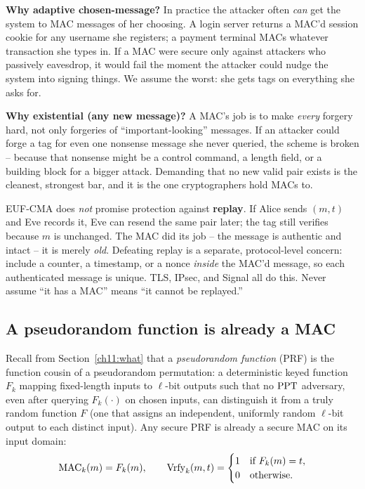 \begin{whybox}
\textbf{Why adaptive chosen-message?} In practice the attacker often \emph{can} get the system to MAC messages of her choosing. A login server returns a MAC'd session cookie for any username she registers; a payment terminal MACs whatever transaction she types in. If a MAC were secure only against attackers who passively eavesdrop, it would fail the moment the attacker could nudge the system into signing things. We assume the worst: she gets tags on everything she asks for.

\textbf{Why existential (any new message)?} A MAC's job is to make \emph{every} forgery hard, not only forgeries of ``important-looking'' messages. If an attacker could forge a tag for even one nonsense message she never queried, the scheme is broken -- because that nonsense might be a control command, a length field, or a building block for a bigger attack. Demanding that no new valid pair exists is the cleanest, strongest bar, and it is the one cryptographers hold MACs to.
\end{whybox}

\begin{trapbox}
EUF-CMA does \emph{not} promise protection against \textbf{replay}. If Alice sends $(m,t)$ and Eve records it, Eve can resend the same pair later; the tag still verifies because $m$ is unchanged. The MAC did its job -- the message is authentic and intact -- it is merely \emph{old}. Defeating replay is a separate, protocol-level concern: include a counter, a timestamp, or a nonce \emph{inside} the MAC'd message, so each authenticated message is unique. TLS, IPsec, and Signal all do this. Never assume ``it has a MAC'' means ``it cannot be replayed.''
\end{trapbox}

\subsection{A pseudorandom function is already a MAC}
\label{ch15:prf-is-mac}

Recall from Section~\ref{ch11:what} that a \emph{pseudorandom function} (PRF) is the function cousin of a pseudorandom permutation: a deterministic keyed function $F_k$ mapping fixed-length inputs to $\ell$-bit outputs such that no $\mathrm{PPT}$ adversary, even after querying $F_k(\cdot)$ on chosen inputs, can distinguish it from a truly random function $F$ (one that assigns an independent, uniformly random $\ell$-bit output to each distinct input). Any secure PRF is already a secure MAC on its input domain:
\[
  \operatorname{MAC}_k(m) = F_k(m), \qquad
  \operatorname{Vrfy}_k(m,t) =
  \begin{cases}
    1 & \text{if } F_k(m) = t, \\
    0 & \text{otherwise.}
  \end{cases}
\]

